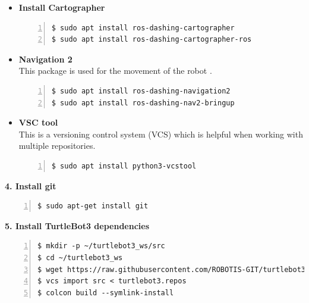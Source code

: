 \documentclass[plainarticle,zihtitle,english,final,hyperref,utf8]{zihpub}
\begin{document}
\begin{itemize}
    \item \textbf{Install Cartographer} \\
    \begin{Verbatim}[breaklines=true, breakanywhere=true, baselinestretch=1,fontsize=\scriptsize,numbers=left,frame=single,stepnumber=5,xleftmargin=1cm,xrightmargin=1cm]
$ sudo apt install ros-dashing-cartographer
$ sudo apt install ros-dashing-cartographer-ros
    \end{Verbatim}
    
    \item \textbf{Navigation 2} \\
    This package is used for the movement of the robot \cite{navigation2}.
    \begin{Verbatim}[breaklines=true, breakanywhere=true, baselinestretch=1,fontsize=\scriptsize,numbers=left,frame=single,stepnumber=5,xleftmargin=1cm,xrightmargin=1cm]
$ sudo apt install ros-dashing-navigation2
$ sudo apt install ros-dashing-nav2-bringup
    \end{Verbatim}
    
    \item \textbf{VSC tool} \\
    This is a versioning control system (VCS) which is helpful when working with multiple repositories.
    \begin{Verbatim}[breaklines=true, breakanywhere=true, baselinestretch=1,fontsize=\scriptsize,numbers=left,frame=single,stepnumber=5,xleftmargin=1cm,xrightmargin=1cm]
$ sudo apt install python3-vcstool
    \end{Verbatim}
\end{itemize}

\textbf{4. Install git}\\
    \begin{Verbatim}[breaklines=true, breakanywhere=true, baselinestretch=1,fontsize=\scriptsize,numbers=left,frame=single,stepnumber=5,xleftmargin=1cm,xrightmargin=1cm]
$ sudo apt-get install git
    \end{Verbatim}
    
\newpage
\textbf{5. Install TurtleBot3 dependencies}\\
    \begin{Verbatim}[breaklines=true, breakanywhere=true, baselinestretch=1,fontsize=\scriptsize,numbers=left,frame=single,stepnumber=5,xleftmargin=1cm,xrightmargin=1cm]
$ mkdir -p ~/turtlebot3_ws/src
$ cd ~/turtlebot3_ws
$ wget https://raw.githubusercontent.com/ROBOTIS-GIT/turtlebot3/ros2/turtlebot3.repos
$ vcs import src < turtlebot3.repos
$ colcon build --symlink-install
    \end{Verbatim}
    
\end{document}
